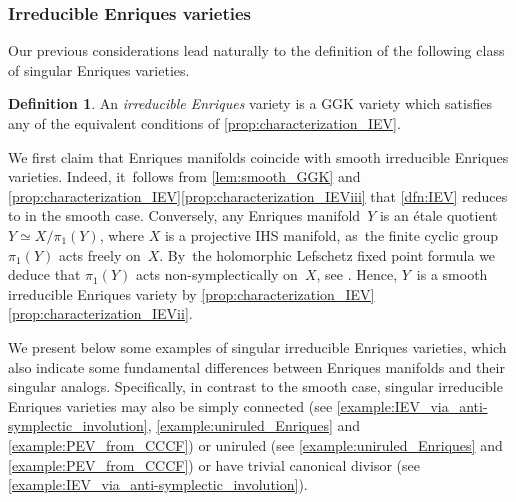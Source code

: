 \documentclass[JEP,XML,SOM,Unicode,published]{cedram}
\theoremstyle{plain}
\theoremstyle{definition}
\newtheorem{dfn}[thm]{Definition}
\begin{document}
\subsubsection{Irreducible Enriques varieties}

Our previous considerations lead naturally to the definition of the following class of singular Enriques varieties.

\begin{dfn}
\label{dfn:IEV}
An \emph{irreducible Enriques} variety is a GGK variety which satisfies any of the equivalent conditions of \autoref{prop:characterization_IEV}.
\end{dfn}

We first claim that Enriques manifolds coincide with smooth irreducible Enriques varieties. Indeed, it~follows from \autoref{lem:smooth_GGK} and \autoref{prop:characterization_IEV}\eqref{prop:characterization_IEViii} that \autoref{dfn:IEV} reduces to \cite[Def.\,2.1]{OS11a} in the smooth case. Conversely, any Enriques manifold~$Y$ is an étale quotient $Y \simeq X / \pi_1(Y)$, where $X$ is a projective IHS manifold, as~the finite cyclic group $\pi_1(Y)$ acts freely on~$X$. By~the holomorphic Lefschetz fixed point formula we deduce that $\pi_1(Y)$ acts non-symplectically on~$X$, see \cite[\S 2.2]{BNWS11}. Hence, $Y$~is a smooth irreducible Enriques variety by \autoref{prop:characterization_IEV}\eqref{prop:characterization_IEVii}.

We present below some examples of singular irreducible Enriques varieties, which also indicate some fundamental differences between Enriques manifolds and their singular analogs. Specifically, in contrast to the smooth case, singular irreducible Enriques varieties may also be simply connected (see \autoref{example:IEV_via_anti-symplectic_involution}, \autoref{example:uniruled_Enriques} and \autoref{example:PEV_from_CCCF}) or uniruled (see \autoref{example:uniruled_Enriques} and \autoref{example:PEV_from_CCCF}) or have trivial canonical divisor (see \autoref{example:IEV_via_anti-symplectic_involution}).
\end{document}
